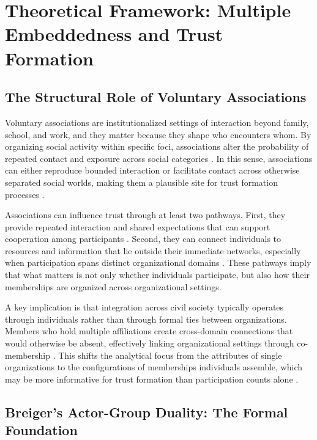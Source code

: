 \section{Theoretical Framework: Multiple Embeddedness and Trust Formation}

\subsection{The Structural Role of Voluntary Associations}

Voluntary associations are institutionalized settings of interaction beyond family, school, and work, and they matter because they shape who encounters whom. By organizing social activity within specific foci, associations alter the probability of repeated contact and exposure across social categories \parencite{knoke_associations_1986, feld_focused_1981}. In this sense, associations can either reproduce bounded interaction or facilitate contact across otherwise separated social worlds, making them a plausible site for trust formation processes \parencite{blau_exchange_1986, mcpherson_hypernetwork_1982}.

Associations can influence trust through at least two pathways. First, they provide repeated interaction and shared expectations that can support cooperation among participants \parencite{glanville_voluntary_2004, paxton_trust_2018}. Second, they can connect individuals to resources and information that lie outside their immediate networks, especially when participation spans distinct organizational domains \parencite{lin_social_2002, diani_cement_2015}. These pathways imply that what matters is not only whether individuals participate, but also how their memberships are organized across organizational settings.

A key implication is that integration across civil society typically operates through individuals rather than through formal ties between organizations. Members who hold multiple affiliations create cross-domain connections that would otherwise be absent, effectively linking organizational settings through co-membership \parencite{diani_cement_2015, pachucki_cultural_2010}. This shifts the analytical focus from the attributes of single organizations to the configurations of memberships individuals assemble, which may be more informative for trust formation than participation counts alone \parencite{moody_structural_2003, paxton_association_2007, baldassarri_integrative_2007}.


\subsection{Breiger's Actor-Group Duality: The Formal Foundation}

